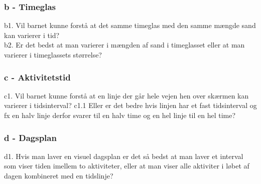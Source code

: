 \subsubsection{b - Timeglas}
b1. Vil barnet kunne forst\aa{} at det samme timeglas med den samme m\ae{}ngde sand kan varierer i tid?
\\
b2. Er det bedst at man varierer i m\ae{}ngden af sand i timeglasset eller at man varierer i timeglassets st\o{}rrelse?

\subsubsection{c - Aktivitetstid}
c1. Vil barnet kunne forst\aa{} at en linje der g\aa{}r hele vejen hen over sk\ae{}rmen kan varierer i tidsinterval?      
c1.1 Eller er det bedre hvis linjen har et fast tidsinterval og fx en halv linje derfor svarer til en halv time og en hel linje til en hel time? 

\subsubsection{d - Dagsplan}
d1. Hvis man laver en visuel dagsplan er det s\aa{} bedst at man laver et interval som viser tiden imellem to aktiviteter, eller at man viser alle aktiviter i l\o{}bet af dagen kombineret med en tidslinje?

